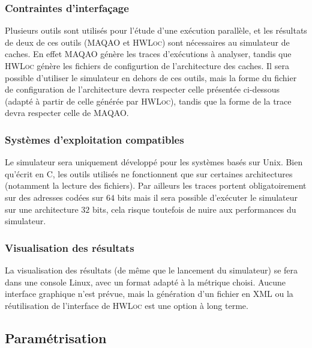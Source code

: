 \subsubsection{Contraintes d'interfaçage}

Plusieurs outils sont utilisés pour l'étude d'une exécution parallèle, et les résultats de deux de ces outils (\textsc{MAQAO} et \textsc{HWLoc}) sont nécessaires au simulateur de caches. En effet \textsc{MAQAO} génère les traces d'exécutions à analyser, tandis que \textsc{HWLoc}
génère les fichiers de configurtion de l'architecture des caches. Il sera possible d'utiliser le simulateur en dehors de ces outils, mais la forme du fichier de configuration de l'architecture devra respecter celle présentée ci-dessous (adapté à partir de celle générée par \textsc{HWLoc}), tandis que la forme de la trace devra respecter celle de \textsc{MAQAO}.

\subsubsection{Systèmes d'exploitation compatibles}

Le simulateur sera uniquement développé pour les systèmes basés sur Unix. Bien qu'écrit en \textsc{C}, les outils utilisés ne fonctionnent que sur certaines architectures (notamment la lecture des fichiers). Par ailleurs les traces portent obligatoirement sur des adresses codées sur $64$ bits mais il sera possible d'exécuter le simulateur sur une architecture $32$ bits, cela risque toutefois de nuire aux performances du simulateur.

\subsubsection{Visualisation des résultats}

La visualisation des résultats (de même que le lancement du simulateur) se fera dans une console Linux, avec un format adapté à la métrique choisi. Aucune interface graphique n'est prévue, mais la génération d'un fichier en \textsc{XML} ou la réutilisation de l'interface de \textsc{HWLoc} est une option à long terme.

\subsection{Paramétrisation}
\label{param}

